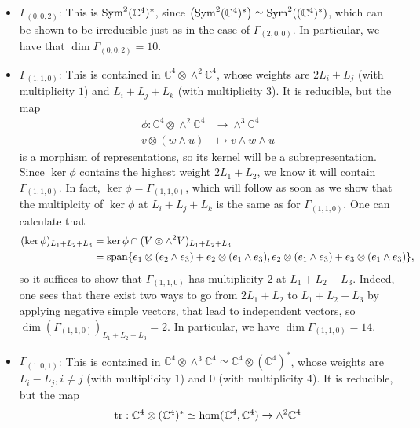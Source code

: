 \documentclass{report}
\begin{document}
\begin{itemize}
    \item {\bf \underline{$\Gamma_{(0,0,2)}$}}: This is $\operatorname{Sym}^2(\mathbb C^4)^*$, since $\left( \operatorname{Sym}^2(\mathbb C^4)^* \right) \simeq \operatorname{Sym}^2((\mathbb C^4)^*)$, which can be shown to be irreducible just as in the case of $\Gamma_{(2,0,0)}$.
    In particular, we have that $\dim \Gamma_{(0,0,2)} = 10$.
    \item {\bf \underline{$\Gamma_{(1,1,0)}$}}: This is contained in $\mathbb C^4 \otimes \wedge^2 \mathbb C^4$, whose weights are $2L_i + L_j$ (with multiplicity $1$) and $L_i + L_j + L_k$ (with multiplicity $3$).
    It is reducible, but the map
    \begin{align*}
        \phi: \mathbb C^4 \otimes \wedge^2 \mathbb C^4 &\to \wedge^3 \mathbb C^4\\
        v \otimes (w \wedge u) &\mapsto v \wedge w \wedge u
    \end{align*}
    is a morphism of representations, so its kernel will be a subrepresentation. Since $\ker \phi$ contains the highest weight $2L_1 + L_2$, we know it will contain $\Gamma_{(1,1,0)}$.
    In fact, $\ker \phi = \Gamma_{(1,1,0)}$, which will follow as soon as we show that the multiplcity of $\ker \phi$ at $L_i + L_j + L_k$ is the same as for $\Gamma_{(1,1,0)}$.
    One can calculate that
    \begin{align*}
        (\ker \phi)_{L_1 + L_2 + L_3} &= \ker \phi \cap (V \otimes \wedge^2 V)_{L_1 + L_2 + L_3}\\
        &= \operatorname{span} \{e_1 \otimes (e_2 \wedge e_3) + e_2 \otimes (e_1 \wedge e_3), e_2 \otimes (e_1 \wedge e_3) + e_3 \otimes (e_1 \wedge e_3)\},
    \end{align*}
    so it suffices to show that $\Gamma_{(1,1,0)}$ has multiplicity $2$ at $L_1 + L_2 + L_3$.
    Indeed, one sees that there exist two ways to go from $2L_1 + L_2$ to $L_1+L_2+L_3$ by applying negative simple vectors, that lead to independent vectors, so $\dim (\Gamma_{(1,1,0)})_{L_1 + L_2 + L_3} = 2$.
    In particular, we have $\dim \Gamma_{(1,1,0)} = 14$.
    \item {\bf \underline{$\Gamma_{(1,0,1)}$}}: This is contained in $\mathbb C^4 \otimes \wedge^3 \mathbb C^4 \simeq \mathbb C^4 \otimes (\mathbb C^4)^*$, whose weights are $L_i - L_j, i \neq j$ (with multiplicity $1$) and $0$ (with multiplicity $4$).
    It is reducible, but the map
    \begin{align*}
        \tr: \mathbb C^4 \otimes (\mathbb C^4)^* \simeq \hom(\mathbb C^4, \mathbb C^4) &\to \wedge^2 \mathbb C^4\\

\end{align*}
\end{itemize}
\end{document}
